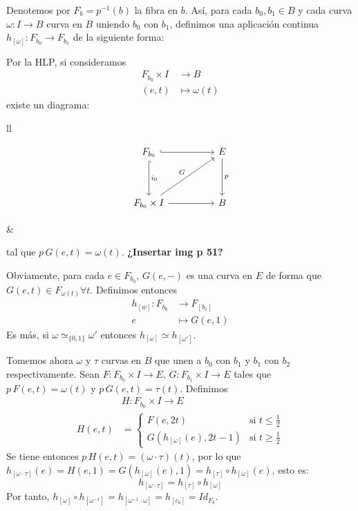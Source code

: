 \begin{demo}
Denotemos por $F_b = p^{-1}(b)$ la fibra en $b$. Así, para cada $b_0, b_1 \in B$ y cada curva $\omega : I \longrightarrow B$ curva en $B$ uniendo $b_0$ con $b_1$, definimos una aplicación continua $h_[\omega] : F_{b_0} \longrightarrow F_{b_1}$ de la siguiente forma: \par 
Por la HLP, si consideramos 
\begin{align*}
F_{b_0} \times I &\longrightarrow B \\
(e, t) &\longmapsto \omega(t)
\end{align*}
existe un diagrama: \par
\begin{tabular}{ll}
\begin{minipage}{0.5\textwidth}
\[
\begin{tikzcd}
F_{b_0} \arrow[hook]{rr} \arrow[hook]{dd}{i_0} & & E \arrow{dd}{p} \\
\\
F_{b_0} \times I \arrow{rr} \arrow{uurr}{G} & & B
\end{tikzcd}
\]
\end{minipage}
&
\begin{minipage}{0.5\textwidth}
tal que $p \, G(e,t) = \omega(t)$. \textbf{¿Insertar img p 51?}
\end{minipage}
\end{tabular}
Obviamente, para cada $e \in F_{b_0}$, $G(e,-)$ es una curva en $E$ de forma que $G(e,t) \in F_{\omega(t)} \forall t$. Definimos entonces
\begin{align*}
h_{[w]} : F_{b_0} &\longrightarrow F_{[b_1]} \\
e &\longmapsto G(e,1)
\end{align*}
Es más, si $\omega \simeq_{\{0,1\}} \omega'$ entonces $h_{[\omega]} \simeq h_{[\omega']}$. \par
Tomemos ahora $\omega$ y $\tau$ curvas en $B$ que unen a $b_0$ con $b_1$ y $b_1$ con $b_2$ respectivamente. Sean $F : F_{b_0} \times I \longrightarrow E$, $G: F_{b_1} \times I \longrightarrow E$ tales que $p \, F(e,t) = \omega(t)$ y $p \, G(e,t) = \tau(t)$. Definimos
\begin{align*}
& H : F_{b_0} \times I \longrightarrow E \\
H(e,t) &= \begin{cases}
F(e, 2t) & \text{si } t \leq \frac{1}{2} \\
G(h_{[\omega]}(e), 2t -1) & \text{si } t \geq \frac{1}{2}
\end{cases}
\end{align*}
Se tiene entonces $p \, H(e,t) = (\omega \cdotp \tau)(t)$, por lo que $h_{[\omega \cdotp \tau]} (e) = H(e,1) = G(h_{[\omega]}(e), 1) = 
h_{[\tau]} \circ h_{[\omega]}(e)$, esto es:
\[ h_{[\omega \cdotp \tau]} = h_{[\tau]} \circ h_{[\omega]} \]
Por tanto, $h_{[\omega]} \circ h_{[\omega^{-1}]} = h_{[\omega^{-1} \cdotp \omega]} = h_{[c_b]} = Id_{F_b}$.


\end{demo}
